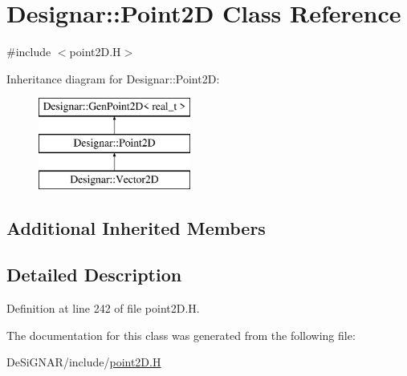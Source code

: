 \hypertarget{class_designar_1_1_point2_d}{}\section{Designar\+:\+:Point2D Class Reference}
\label{class_designar_1_1_point2_d}


{\ttfamily \#include $<$point2\+D.\+H$>$}

Inheritance diagram for Designar\+:\+:Point2D\+:\begin{figure}[H]
\begin{center}
\leavevmode
\includegraphics[height=3.000000cm]{class_designar_1_1_point2_d}
\end{center}
\end{figure}
\subsection*{Additional Inherited Members}


\subsection{Detailed Description}


Definition at line 242 of file point2\+D.\+H.



The documentation for this class was generated from the following file\+:\begin{DoxyCompactItemize}
\item 
De\+Si\+G\+N\+A\+R/include/\hyperlink{point2_d_8_h}{point2\+D.\+H}\end{DoxyCompactItemize}
